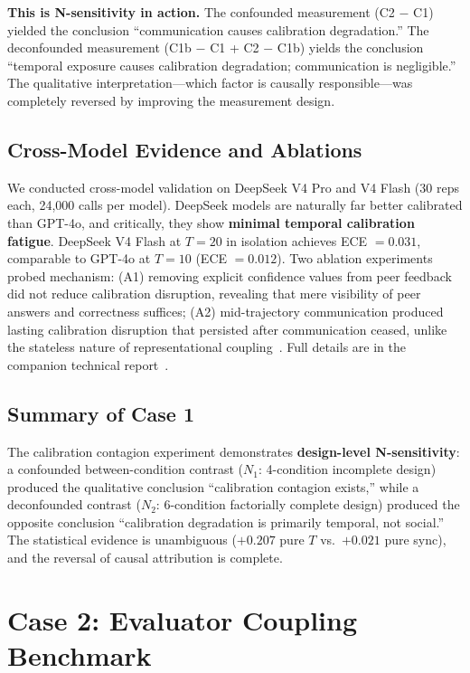 \documentclass[11pt]{article}
\begin{document}
\textbf{This is N-sensitivity in action.} The confounded measurement (C2 $-$ C1) yielded the conclusion ``communication causes calibration degradation.'' The deconfounded measurement (C1b $-$ C1 + C2 $-$ C1b) yields the conclusion ``temporal exposure causes calibration degradation; communication is negligible.'' The qualitative interpretation---which factor is causally responsible---was completely reversed by improving the measurement design.

\subsection{Cross-Model Evidence and Ablations}

We conducted cross-model validation on DeepSeek V4 Pro and V4 Flash (30 reps each, 24,000 calls per model). DeepSeek models are naturally far better calibrated than GPT-4o, and critically, they show \textbf{minimal temporal calibration fatigue}. DeepSeek V4 Flash at $T{=}20$ in isolation achieves ECE $=0.031$, comparable to GPT-4o at $T{=}10$ (ECE $=0.012$). Two ablation experiments probed mechanism: (A1) removing explicit confidence values from peer feedback did not reduce calibration disruption, revealing that mere visibility of peer answers and correctness suffices; (A2) mid-trajectory communication produced lasting calibration disruption that persisted after communication ceased, unlike the stateless nature of representational coupling~\cite{liu2026boundarysync}. Full details are in the companion technical report~\cite{liu2026calibrationcontagion}.

\subsection{Summary of Case 1}

The calibration contagion experiment demonstrates \textbf{design-level N-sensitivity}: a confounded between-condition contrast ($N_1$: 4-condition incomplete design) produced the qualitative conclusion ``calibration contagion exists,'' while a deconfounded contrast ($N_2$: 6-condition factorially complete design) produced the opposite conclusion ``calibration degradation is primarily temporal, not social.'' The statistical evidence is unambiguous ($+0.207$ pure $T$ vs.\ $+0.021$ pure sync), and the reversal of causal attribution is complete.

\section{Case 2: Evaluator Coupling Benchmark}
\label{sec:case2}
\end{document}
